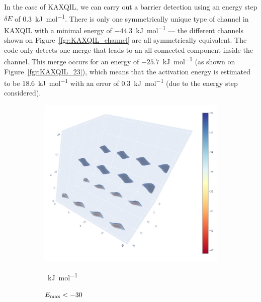 \documentclass[main]{subfiles}
\begin{document}
In the case of KAXQIL, we can carry out a barrier detection using an energy step $\delta E$ of \SI{0.3}{\kJ\per\mol}. There is only one symmetrically unique type of channel in KAXQIL with a minimal energy of $-44.3$~\si{\kJ\per\mole} --- the different channels shown on Figure~\ref{fgr:KAXQIL_channel} are all symmetrically equivalent. The code only detects one merge that leads to an all connected component inside the channel. This merge occurs for an energy of $-25.7$~\si{\kJ\per\mole} (as shown on Figure~\ref{fgr:KAXQIL_23}), which means that the activation energy is estimated to be $18.6$~\si{\kJ\per\mole} with an error of \SI{0.3}{\kJ\per\mole} (due to the energy step considered). 

\begin{figure}[ht]
  \centering
  \begin{subfigure}[b]{0.3\textwidth}
    \centering
    \includegraphics[width=\textwidth]{figures/5-diffusion/KAXQIL_30.jpg}
    \caption{$E_{\text{max}}<-30$}~\si{\kJ\per\mole}\label{fgr:KAXQIL_30}
  \end{subfigure}
  \hfill
  \begin{subfigure}[b]{0.3\textwidth}
    \centering

\end{subfigure}
\end{figure}
\end{document}
